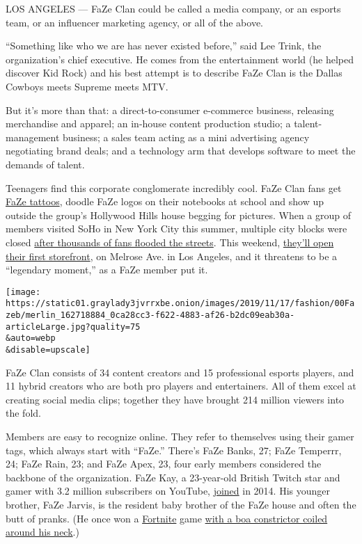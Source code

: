 LOS ANGELES --- FaZe Clan could be called a media company, or an esports
team, or an influencer marketing agency, or all of the above.

``Something like who we are has never existed before,'' said Lee Trink,
the organization's chief executive. He comes from the entertainment
world (he helped discover Kid Rock) and his best attempt is to describe
FaZe Clan is the Dallas Cowboys meets Supreme meets MTV.

But it's more than that: a direct-to-consumer e-commerce business,
releasing merchandise and apparel; an in-house content production
studio; a talent-management business; a sales team acting as a mini
advertising agency negotiating brand deals; and a technology arm that
develops software to meet the demands of talent.

Teenagers find this corporate conglomerate incredibly cool. FaZe Clan
fans get
\href{https://steamcommunity.com/sharedfiles/filedetails/?id=923302605}{FaZe
tattoos}, doodle FaZe logos on their notebooks at school and show up
outside the group's Hollywood Hills house begging for pictures. When a
group of members visited SoHo in New York City this summer, multiple
city blocks were closed
\href{https://twitter.com/Banks/status/1154799297696804869}{after
thousands of fans flooded the streets}. This weekend,
\href{https://twitter.com/banks/status/1195117347964506113?s=21}{they'll
open their first storefront}, on Melrose Ave. in Los Angeles, and it
threatens to be a ``legendary moment,'' as a FaZe member put it.

\texttt{[image: https://static01.graylady3jvrrxbe.onion/images/2019/11/17/fashion/00Fazeb/merlin\_162718884\_0ca28cc3-f622-4883-af26-b2dc09eab30a-articleLarge.jpg?quality=75\\\&auto=webp\\\&disable=upscale]}

FaZe Clan consists of 34 content creators and 15 professional esports
players, and 11 hybrid creators who are both pro players and
entertainers. All of them excel at creating social media clips; together
they have brought 214 million viewers into the fold.

Members are easy to recognize online. They refer to themselves using
their gamer tags, which always start with ``FaZe.'' There's FaZe Banks,
27; FaZe Temperrr, 24; FaZe Rain, 23; and FaZe Apex, 23, four early
members considered the backbone of the organization. FaZe Kay, a
23-year-old British Twitch star and gamer with 3.2 million subscribers
on YouTube,
\href{https://twitter.com/fazekay/status/618055823953149952?lang=en}{joined}
in 2014. His younger brother, FaZe Jarvis, is the resident baby brother
of the FaZe house and often the butt of pranks. (He once won a
\href{https://www.nytimes3xbfgragh.onion/2018/05/02/style/fortnite.html}{Fortnite}
game \href{https://www.youtube.com/watch?v=0jyxMXJSCDs}{with a boa
constrictor coiled around his neck}.)

